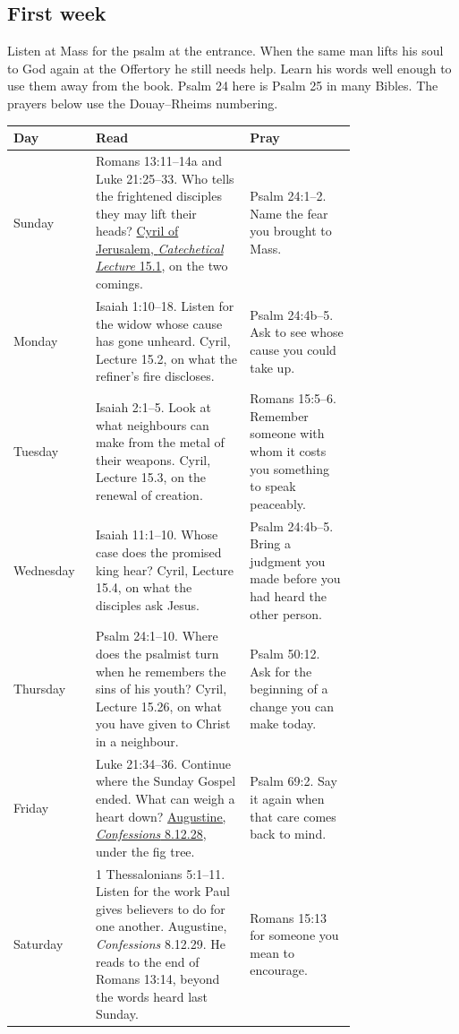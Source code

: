 \subsection{First week}

Listen at Mass for the psalm at the entrance. When the same man lifts
his soul to God again at the Offertory he still needs help. Learn his
words well enough to use them away from the book. Psalm 24 here is
Psalm 25 in many Bibles. The prayers below use the Douay--Rheims numbering.

\begin{longtable}{@{}lp{0.45\linewidth}p{0.31\linewidth}@{}}
\textbf{Day} & \textbf{Read} & \textbf{Pray} \\
\hline
\endhead
Sunday & Romans 13:11--14a and Luke 21:25--33. Who tells the frightened disciples they may lift their heads? \href{https://www.newadvent.org/fathers/310115.htm}{Cyril of Jerusalem, \emph{Catechetical Lecture} 15.1}, on the two comings. & Psalm 24:1--2. Name the fear you brought to Mass. \\
Monday & Isaiah 1:10--18. Listen for the widow whose cause has gone unheard. Cyril, Lecture 15.2, on what the refiner's fire discloses. & Psalm 24:4b--5. Ask to see whose cause you could take up. \\
Tuesday & Isaiah 2:1--5. Look at what neighbours can make from the metal of their weapons. Cyril, Lecture 15.3, on the renewal of creation. & Romans 15:5--6. Remember someone with whom it costs you something to speak peaceably. \\
Wednesday & Isaiah 11:1--10. Whose case does the promised king hear? Cyril, Lecture 15.4, on what the disciples ask Jesus. & Psalm 24:4b--5. Bring a judgment you made before you had heard the other person. \\
Thursday & Psalm 24:1--10. Where does the psalmist turn when he remembers the sins of his youth? Cyril, Lecture 15.26, on what you have given to Christ in a neighbour. & Psalm 50:12. Ask for the beginning of a change you can make today. \\
Friday & Luke 21:34--36. Continue where the Sunday Gospel ended. What can weigh a heart down? \href{https://www.newadvent.org/fathers/110108.htm}{Augustine, \emph{Confessions} 8.12.28}, under the fig tree. & Psalm 69:2. Say it again when that care comes back to mind. \\
Saturday & 1 Thessalonians 5:1--11. Listen for the work Paul gives believers to do for one another. Augustine, \emph{Confessions} 8.12.29. He reads to the end of Romans 13:14, beyond the words heard last Sunday. & Romans 15:13 for someone you mean to encourage. \\
\end{longtable}

